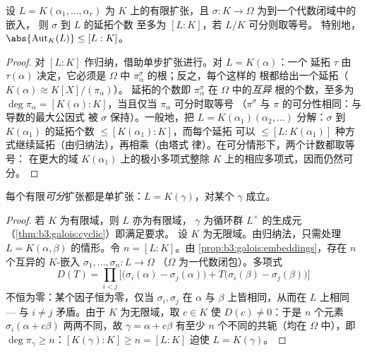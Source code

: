 \begin{proposition}[嵌入计数]\label{prop:b3:galois:embeddings}
设 $L = K(\alpha_1, \dots, \alpha_r)$ 为 $K$ 上的有限扩张，且
$\sigma \colon K \to \Omega$ 为到一个代数闭域中的嵌入，
则 $\sigma$ 到 $L$ 的延拓个数
至多为 $[L:K]$，若 $L/K$ 可分则取等号。
特别地，$\abs{\operatorname{Aut}_K(L)} \leq [L:K]$。
\end{proposition}

\begin{proof}
对 $[L:K]$ 作归纳，借助单步扩张进行。对 $L = K(\alpha)$：一个
延拓 $\tau$ 由 $\tau(\alpha)$ 决定，它必须是
$\Omega$ 中 $\pi_\alpha^\sigma$ 的根；反之，每个这样的
根都给出一个延拓（$K(\alpha) \cong K[X]/(\pi_\alpha)$）。
延拓的个数即 $\pi_\alpha^\sigma$ 在 $\Omega$ 中的\emph{互异}
根的个数，至多为 $\deg\pi_\alpha =
[K(\alpha):K]$，当且仅当 $\pi_\alpha$ 可分时取等号
（$\pi^\sigma$ 与 $\pi$ 的可分性相同：与导数的最大公因式
被 $\sigma$ 保持）。一般地，把 $L =
K(\alpha_1)(\alpha_2, \dots)$ 分解：$\sigma$ 到
$K(\alpha_1)$ 的延拓个数 $\leq [K(\alpha_1):K]$，而每个延拓
可以 $\leq [L : K(\alpha_1)]$ 种方式继续延拓（由归纳法），再相乘（由塔式
律）。在可分情形下，两个计数都取等号：
在更大的域 $K(\alpha_1)$ 上的极小多项式整除
$K$ 上的相应多项式，因而仍然可分。
\end{proof}

\begin{theorem}[本原元定理]\label{thm:b3:galois:primitive}
每个有限\emph{可分}扩张都是单扩张：$L =
K(\gamma)$，对某个 $\gamma$ 成立。
\end{theorem}

\begin{proof}
若 $K$ 为有限域，则 $L$ 亦为有限域，
$\gamma$ 为循环群 $L^\times$ 的生成元（\cref{thm:b3:galois:cyclic}）即满足要求。
设 $K$ 为无限域。由归纳法，只需处理 $L =
K(\alpha, \beta)$ 的情形。令 $n = [L:K]$。由
\cref{prop:b3:galois:embeddings}，存在 $n$ 个互异的
$K$-嵌入 $\sigma_1, \dots, \sigma_n \colon L \to \Omega$
（$\Omega$ 为一代数闭包）。多项式
\[
D(T)=\prod_{i<j}\bigl[\bigl(\sigma_i(\alpha)-\sigma_j(\alpha)
\bigr) + T\bigl(\sigma_i(\beta) - \sigma_j(\beta)\bigr)\bigr]
\]
不恒为零：某个因子恒为零，仅当
$\sigma_i, \sigma_j$ 在 $\alpha$ 与 $\beta$ 上皆相同，从而在
$L$ 上相同 --- 与 $i \neq j$ 矛盾。由于 $K$ 为无限域，取 $c \in
K$ 使 $D(c) \ne 0$：于是 $n$ 个元素 $\sigma_i(\alpha +
c\beta)$ 两两不同，故 $\gamma = \alpha + c\beta$
有至少 $n$ 个不同的共轭（均在 $\Omega$ 中），即
$\deg \pi_\gamma \geq n$：$[K(\gamma):K] \geq n = [L:K]$ 迫使
$L = K(\gamma)$。
\end{proof}

